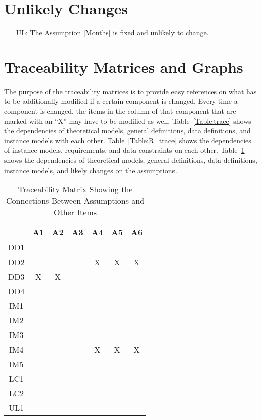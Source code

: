 \documentclass[12pt]{article}
\newcounter{lcnum} %
\begin{document}
\section{Unlikely Changes}    

\noindent \begin{itemize}

\item[UL\refstepcounter{lcnum}\thelcnum\label{UL_meaningfulLabel}:] The \hyperref[Months]{Assumption \ref*{Months}} is fixed and unlikely to change.

\end{itemize}

\section{Traceability Matrices and Graphs}

The purpose of the traceability matrices is to provide easy references on what has to be additionally modified if a certain component is changed.  Every time a component is changed, the items in the column of that component that are marked with an ``X'' may have to be modified as well. Table~\ref{Table:trace} shows the dependencies of theoretical models, general definitions, data definitions, and instance models with each other. Table~\ref{Table:R_trace} shows the dependencies of instance models, requirements, and data constraints on each other. Table~\ref{Table:A_trace} shows the dependencies of theoretical models, general definitions, data definitions, instance models, and likely changes on the assumptions.

\begin{table}[htbp]
\centering
\begin{tabular}{|c|c|c|c|c|c|c|}
\hline
 & A1 & A2 &  A3& A4 & A5 & A6 \\
\hline
DD1 &  &  &  &  &  &  \\ \hline
DD2 &  &  &  & X & X & X \\ \hline
DD3 & X & X &  &  &  &  \\ \hline
DD4 &  &  &  &  &  &  \\ \hline
IM1 &  &  &  &  &  &  \\ \hline
IM2 &  &  &  &  &  &  \\ \hline
IM3 &  &  &  &  &  &  \\ \hline
IM4&  &  &  & X & X & X \\ \hline
IM5 &  &  &  &  &  &  \\ \hline
LC1 &  &  &  &  &  &  \\ \hline
LC2 &  &  &  &  &  &  \\ \hline
UL1 &  &  &  &  &  &  \\ \hline
\end{tabular}
\caption{Traceability Matrix Showing the Connections Between Assumptions and Other Items}
\label{Table:A_trace}
\end{table}
\newpage
\end{document}

